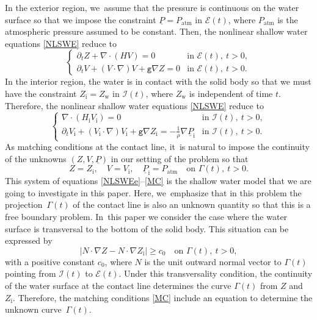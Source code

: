 \documentclass[JEP,XML,SOM,Unicode,NoFloatCountersInSection,published]{cedram}
\newcommand{\gr}{{\mathtt g}}
\newcommand{\dt}{\partial_t}
\newcommand{\cI}{{\mathcal I}}
\newcommand{\cE}{{\mathcal E}}
\newcommand{\ul}[1]{\underline{#1}}
\newcommand{\itGamma}{\mathit{\Gamma}}
\theoremstyle{definition}
\begin{document}
In the exterior region, we~assume that the pressure is continuous on the water surface so that we impose the constraint $\ul{P}=P_\mathrm{atm}$ in $\cE(t)$,
where $P_\mathrm{atm}$ is the atmospheric pressure assumed to be constant.
Then, the nonlinear shallow water equations \eqref{NLSWE} reduce to
\begin{equation}\label{NLSWEe}
\begin{cases}
\dt Z+\nabla\cdot(HV) = 0 &\text{in } \cE(t), \ t>0, \\
\dt V+(V\cdot\nabla)V+\gr\nabla Z = 0 &\text{in } \cE(t), \ t>0.
\end{cases}
\end{equation}
In the interior region, the water is in contact with the solid body so that we must have the constraint $Z_\mathrm{i}=Z_\mathrm{w}$ in $\cI(t)$,
where $Z_\mathrm{w}$ is independent of time $t$.
Therefore, the nonlinear shallow water equations \eqref{NLSWE} reduce to
\begin{equation}\label{NLSWEi}
\begin{cases}
\nabla\cdot(H_\mathrm{i}V_\mathrm{i}) = 0 &\text{in } \cI(t), \ t>0, \\
\dt V_\mathrm{i}+(V_\mathrm{i}\cdot\nabla)V_\mathrm{i}+\gr\nabla Z_\mathrm{i} = -\frac{1}{\rho}\nabla\ul{P}_\mathrm{i} &\text{in } \cI(t), \ t>0.
\end{cases}
\end{equation}
As matching conditions at the contact line, it~is natural to impose the continuity of the unknowns $(Z,V,\ul{P})$ in our setting of the problem so that
\begin{equation}\label{MC}
Z=Z_\mathrm{i}, \quad V=V_\mathrm{i}, \quad \ul{P}_\mathrm{i}=P_\mathrm{atm} \quad\text{on } \itGamma(t), \ t>0.
\end{equation}
This system of equations \eqref{NLSWEe}--\eqref{MC} is the shallow water model that we are going to investigate in this paper.
Here, we~emphasize that in this problem the projection~$\itGamma(t)$ of the contact line is also an unknown quantity so that this is a free boundary problem. In~this paper we consider the case where the water surface is transversal to the bottom of the solid body.
This situation can be expressed by
\begin{equation}\label{TransCond}
|N\cdot\nabla Z-N\cdot\nabla Z_\mathrm{i}| \geq c_0 \quad\text{on } \itGamma(t), \ t>0,
\end{equation}
with a positive constant $c_0$, where $N$ is the unit outward normal vector to $\itGamma(t)$ pointing from $\cI(t)$ to $\cE(t)$.
Under this transversality condition, the continuity of the water surface at the contact line determines the curve $\itGamma(t)$ from $Z$ and $Z_\mathrm{i}$.
Therefore, the matching conditions \eqref{MC} include an equation to determine the unknown curve~$\itGamma(t)$.
\end{document}
